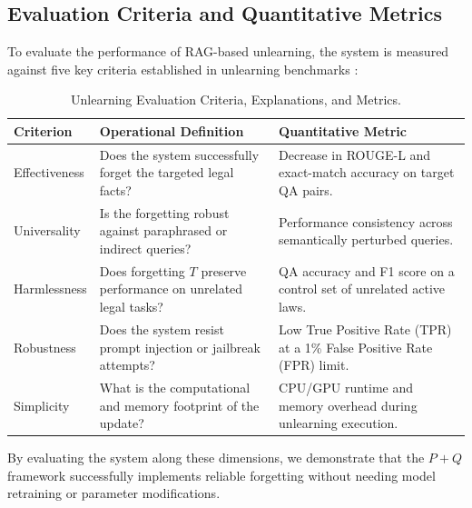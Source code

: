 \subsection{Evaluation Criteria and Quantitative Metrics}
To evaluate the performance of RAG-based unlearning, the system is measured against five key criteria established in unlearning benchmarks \parencite{11207222}:
\begin{table}[H]
\centering
\caption{Unlearning Evaluation Criteria, Explanations, and Metrics.}
\label{tab:unlearning_metrics}
\begin{tabularx}{\textwidth}{lXX}
\hline
\textbf{Criterion} & \textbf{Operational Definition} & \textbf{Quantitative Metric} \\
\hline
Effectiveness & Does the system successfully forget the targeted legal facts? & Decrease in ROUGE-L and exact-match accuracy on target QA pairs. \\
Universality & Is the forgetting robust against paraphrased or indirect queries? & Performance consistency across semantically perturbed queries. \\
Harmlessness & Does forgetting $T$ preserve performance on unrelated legal tasks? & QA accuracy and F1 score on a control set of unrelated active laws. \\
Robustness & Does the system resist prompt injection or jailbreak attempts? & Low True Positive Rate (TPR) at a 1\% False Positive Rate (FPR) limit. \\
Simplicity & What is the computational and memory footprint of the update? & CPU/GPU runtime and memory overhead during unlearning execution. \\
\hline
\end{tabularx}
\end{table}

By evaluating the system along these dimensions, we demonstrate that the $P+Q$ framework successfully implements reliable forgetting without needing model retraining or parameter modifications.
